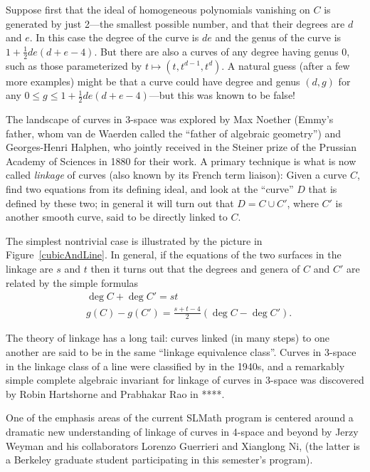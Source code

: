 \documentclass[11pt, oneside]{article}   	%
\begin{document}
Suppose first that the ideal of homogeneous polynomials vanishing on $C$ is generated by just 2---the smallest possible number, and that their degrees are $d$ and $e$. In this case the degree of the curve
is $de$ and the genus of the curve is $1+\frac{1}{2}de(d+e-4)$. But there are also a curves of any degree having genus 0, such as those parameterized by $t \mapsto (t, t^{d-1}, t^{d})$. A natural guess (after a few more examples) might be that a curve could have degree and genus $(d,g)$ for any
$0\leq g \leq 1+\frac{1}{2}de(d+e-4)$---but this was known to be false!

The landscape of curves in 3-space was explored by 
Max Noether (Emmy's father, whom van de Waerden called the ``father of algebraic geometry'') and Georges-Henri Halphen, who jointly received in the Steiner prize of the Prussian Academy of Sciences in 1880 for their work. A primary technique is what is now called \emph{linkage} of curves (also known by its French term liaison):  Given a curve $C$, find two equations from its defining ideal, and look at the ``curve'' $D$ that is defined by these two; in general it will turn out that $D = C\cup C'$, where $C'$ is another smooth curve, said to be directly linked to $C$.

The simplest nontrivial case is illustrated by the picture in
Figure~\ref{cubicAndLine}. In general, if the equations of the two surfaces in the linkage are $s$ and $t$ then it turns out that
the degrees and genera of $C$ and $C'$ are related by the simple formulas
\begin{align*}
&\deg C+\deg C' = st\\
&g(C) - g({C'}) = \frac{s+t-4}{2}(\deg C-\deg {C'}).
\end{align*}

The theory of linkage has a long tail: curves linked (in many steps) to one another are said to be in the same ``linkage equivalence class''. Curves in 3-space in the linkage class of a line were classified by in the 1940s, and a remarkably simple complete algebraic invariant for linkage of curves in 3-space was discovered by Robin Hartshorne and Prabhakar Rao in ****. 

One of the emphasis areas of the current SLMath program is centered around a dramatic new understanding of linkage of curves in 4-space and beyond by Jerzy Weyman and his collaborators
Lorenzo Guerrieri and Xianglong Ni, (the latter is a Berkeley graduate student participating in this semester's program).
\end{document}
